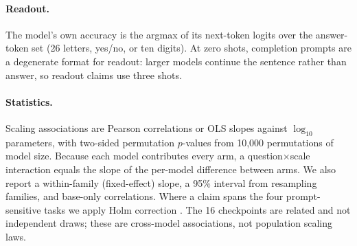 \paragraph{Readout.}
The model's own accuracy is the argmax of its next-token logits over the answer-token set (26
letters, yes/no, or ten digits). At zero shots, completion prompts are a degenerate format for
readout: larger models continue the sentence rather than answer, so readout claims use three shots.

\paragraph{Statistics.}
Scaling associations are Pearson correlations or OLS slopes against $\log_{10}$ parameters, with
two-sided permutation $p$-values from 10{,}000 permutations of model size. Because each model
contributes every arm, a question$\times$scale interaction equals the slope of the per-model
difference between arms. We also report a within-family (fixed-effect) slope, a 95\% interval
from resampling families, and base-only correlations. Where a claim spans the four
prompt-sensitive tasks we apply Holm correction \citep{holm1979}. The 16 checkpoints are related
and not independent draws; these are cross-model associations, not population scaling laws.
